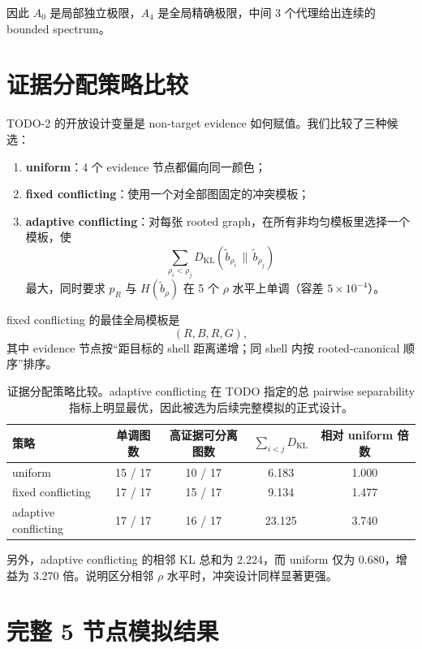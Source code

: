 \documentclass[11pt,a4paper]{ctexart}
\begin{document}
因此 $A_0$ 是局部独立极限，$A_4$ 是全局精确极限，中间 3 个代理给出连续的 bounded spectrum。

\section{证据分配策略比较}

TODO-2 的开放设计变量是 non-target evidence 如何赋值。我们比较了三种候选：
\begin{enumerate}
    \item \textbf{uniform}：4 个 evidence 节点都偏向同一颜色；
    \item \textbf{fixed conflicting}：使用一个对全部图固定的冲突模板；
    \item \textbf{adaptive conflicting}：对每张 rooted graph，在所有非均匀模板里选择一个模板，使
    \[
    \sum_{\rho_i<\rho_j} D_{\mathrm{KL}}(\tilde b_{\rho_i}\,\|\,\tilde b_{\rho_j})
    \]
    最大，同时要求 $p_R$ 与 $H(\tilde b_\rho)$ 在 5 个 $\rho$ 水平上单调（容差 $5\times 10^{-4}$）。
\end{enumerate}

fixed conflicting 的最佳全局模板是
\[
(R,B,R,G),
\]
其中 evidence 节点按“距目标的 shell 距离递增；同 shell 内按 rooted-canonical 顺序”排序。

\begin{table}[ht]
\centering
\small
\begin{tabular}{lcccc}
\toprule
策略 & 单调图数 & 高证据可分离图数 & $\sum_{i<j} D_{\mathrm{KL}}$ & 相对 uniform 倍数 \\
\midrule
uniform & 15 / 17 & 10 / 17 & 6.183 & 1.000 \\
fixed conflicting & 17 / 17 & 15 / 17 & 9.134 & 1.477 \\
adaptive conflicting & 17 / 17 & 16 / 17 & 23.125 & 3.740 \\
\bottomrule
\end{tabular}
\caption{证据分配策略比较。adaptive conflicting 在 TODO 指定的总 pairwise separability 指标上明显最优，因此被选为后续完整模拟的正式设计。}
\end{table}

另外，adaptive conflicting 的相邻 KL 总和为 2.224，而 uniform 仅为 0.680，增益为 3.270 倍。说明区分相邻 $\rho$ 水平时，冲突设计同样显著更强。

\section{完整 5 节点模拟结果}
\end{document}
